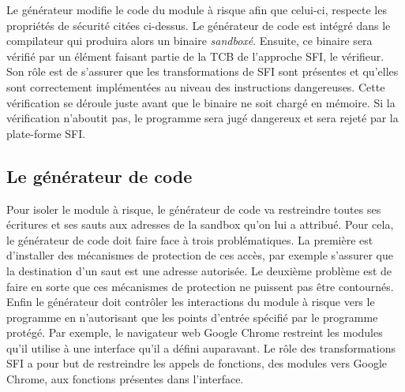 \documentclass[11pt]{sdm}
\begin{document}
Le générateur modifie le code du module à risque afin que celui-ci, respecte les propriétés de sécurité citées ci-dessus. Le générateur de code est intégré dans le compilateur qui produira alors un binaire \textit{sandboxé}. Ensuite, ce binaire sera vérifié par un élément faisant partie de la TCB de l'approche SFI, le vérifieur. Son rôle est de s'assurer que les transformations de SFI sont présentes et qu'elles sont correctement implémentées au niveau des instructions dangereuses. Cette vérification se déroule juste avant que le binaire ne soit chargé en mémoire. Si la vérification n'aboutit pas, le programme sera jugé dangereux et sera rejeté par la plate-forme SFI.

\subsection{Le générateur de code}
Pour isoler le module à risque, le générateur de code va restreindre toutes ses écritures et ses sauts aux adresses de la sandbox qu'on lui a attribué.
Pour cela, le générateur de code doit faire face à trois problématiques. La première est d'installer des mécanismes de protection de ces accès, par exemple s'assurer que la destination d'un saut est une adresse autorisée. Le deuxième problème est de faire en sorte que ces mécanismes de protection ne puissent pas être contournés.
Enfin le générateur doit contrôler les interactions du module à risque vers le programme en n'autorisant que les points d'entrée spécifié par le programme protégé. Par exemple, le navigateur web Google Chrome restreint les modules qu'il utilise à une interface qu'il a défini auparavant. Le rôle des transformations SFI a pour but de restreindre les appels de fonctions, des modules vers Google Chrome, aux fonctions présentes dans l'interface.
\end{document}
